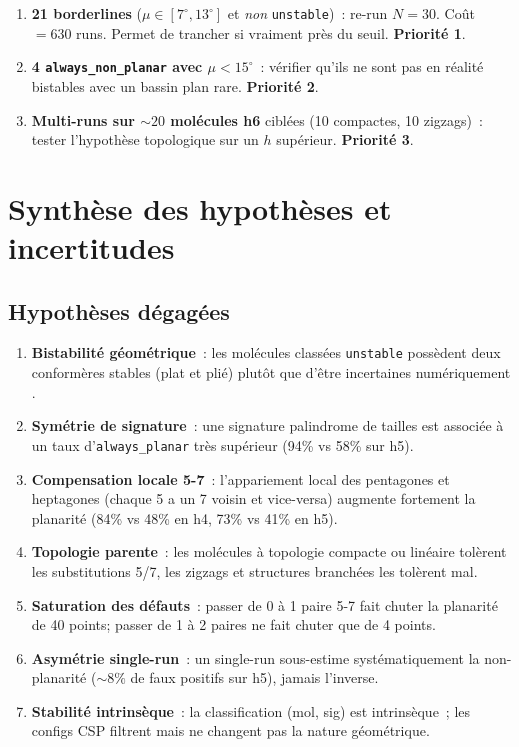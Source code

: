 \documentclass[11pt,a4paper]{article}
\begin{document}
\begin{enumerate}[leftmargin=2em,itemsep=0.3em]
  \item \textbf{21 borderlines} ($\mu \in [7^\circ, 13^\circ]$ et \emph{non} \texttt{unstable})~: re-run $N=30$. Coût $= 630$ runs. Permet de trancher si vraiment près du seuil. \textbf{Priorité 1}.
  \item \textbf{4 \texttt{always\_non\_planar} avec $\mu < 15^\circ$}~: vérifier qu'ils ne sont pas en réalité bistables avec un bassin plan rare. \textbf{Priorité 2}.
  \item \textbf{Multi-runs sur $\sim 20$ molécules h6} ciblées (10 compactes, 10 zigzags)~: tester l'hypothèse topologique sur un $h$ supérieur. \textbf{Priorité 3}.
\end{enumerate}

\section{Synthèse des hypothèses et incertitudes}

\subsection{Hypothèses dégagées}

\begin{enumerate}[leftmargin=2em,itemsep=0.3em]
  \item \textbf{Bistabilité géométrique}~: les molécules classées \texttt{unstable} possèdent deux conformères stables (plat et plié) plutôt que d'être \og incertaines numériquement \fg{}.
  \item \textbf{Symétrie de signature}~: une signature palindrome de tailles est associée à un taux d'\texttt{always\_planar} très supérieur (94\% vs 58\% sur h5).
  \item \textbf{Compensation locale 5-7}~: l'appariement local des pentagones et heptagones (chaque 5 a un 7 voisin et vice-versa) augmente fortement la planarité (84\% vs 48\% en h4, 73\% vs 41\% en h5).
  \item \textbf{Topologie parente}~: les molécules à topologie compacte ou linéaire tolèrent les substitutions 5/7, les zigzags et structures branchées les tolèrent mal.
  \item \textbf{Saturation des défauts}~: passer de 0 à 1 paire 5-7 fait chuter la planarité de 40 points; passer de 1 à 2 paires ne fait chuter que de 4 points.
  \item \textbf{Asymétrie single-run}~: un single-run sous-estime systématiquement la non-planarité ($\sim 8\%$ de faux positifs sur h5), jamais l'inverse.
  \item \textbf{Stabilité intrinsèque}~: la classification (mol, sig) est intrinsèque~; les configs CSP filtrent mais ne changent pas la nature géométrique.
\end{enumerate}
\end{document}
